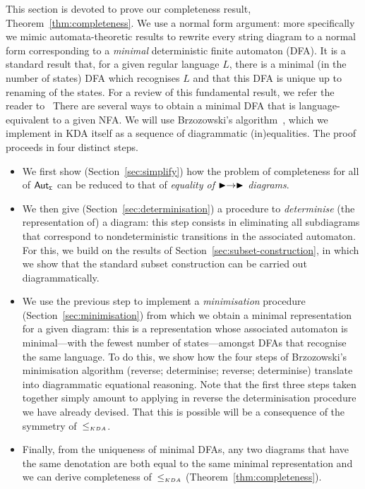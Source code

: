 \documentclass{lmcs}
\theoremstyle{plain}\newtheorem{satz}[thm]{Satz} %
\begin{document}
This section is devoted to prove our completeness result, Theorem~\ref{thm:completeness}. We use a normal form argument: more specifically we mimic automata-theoretic results to rewrite every string diagram to a normal form corresponding to a \emph{minimal} deterministic finite automaton (DFA). It is a standard result that, for a given regular language $L$, there is a minimal (in the number of states) DFA which recognises $L$ and that this DFA is unique up to renaming of the states. For a review of this fundamental result, we refer the reader to~\cite[\S 13-16]{kozen2012automata} There are several ways to obtain a minimal DFA that is language-equivalent to a given NFA\@. We will use Brzozowski's algorithm~\cite{brzozowski1962canonical}, which we implement in KDA itself as a sequence of diagrammatic (in)equalities. The proof proceeds in four distinct steps.
\begin{itemize}
%
\item We first show (Section~\ref{sec:simplify}) how the problem of completeness for all of $\mathsf{Aut_{\scriptscriptstyle{\Sigma}}}$ can be reduced to that of \emph{equality of $\blacktriangleright\to\blacktriangleright$ diagrams}.
\item We then give (Section~\ref{sec:determinisation}) a procedure to \emph{determinise} (the representation of) a diagram: this step consists in eliminating all subdiagrams that correspond to nondeterministic transitions in the associated automaton. For this, we build on the results of Section~\ref{sec:subset-construction}, in which we show that the standard subset construction can be carried out diagrammatically.
\item We use the previous step to implement a \emph{minimisation} procedure (Section~\ref{sec:minimisation}) from which we obtain a minimal representation for a given diagram: this is a representation whose associated automaton is minimal---with the fewest number of states---amongst DFAs that recognise the same language. To do this, we show how the four steps of Brzozowski's minimisation algorithm (reverse; determinise; reverse; determinise) translate into diagrammatic equational reasoning. Note that the first three steps taken together simply amount to applying in reverse the determinisation procedure we have already devised. That this is possible will be a consequence of the symmetry of~$\leq_{\scriptscriptstyle KDA}$.
\item Finally, from the uniqueness of minimal DFAs, any two diagrams that have the same denotation are both equal to the same minimal representation and we can derive completeness of~$\leq_{\scriptscriptstyle KDA}$ (Theorem~\ref{thm:completeness}).
\end{itemize}
\end{document}
